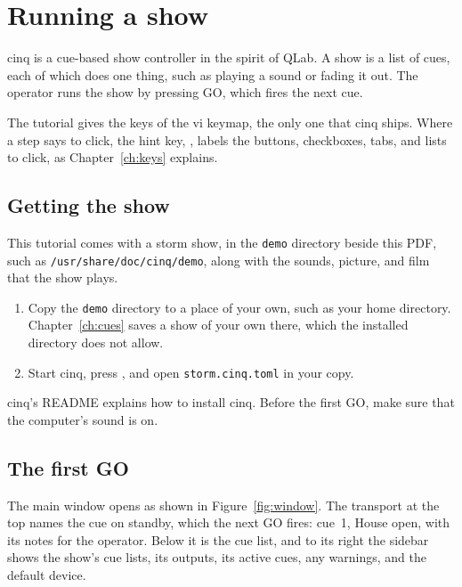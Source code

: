 %

\chapter{Running a show}
\label{ch:running}

cinq is a cue-based show controller in the spirit of QLab.  A show is a list
of cues, each of which does one thing, such as playing a sound or fading it
out.  The operator runs the show by pressing GO, which fires the next cue.

The tutorial gives the keys of the vi keymap, the only one that cinq ships.
Where a step says to click, the hint key, , labels the buttons,
checkboxes, tabs, and lists to click, as Chapter~\ref{ch:keys} explains.

\section{Getting the show}

This tutorial comes with a storm show, in the \texttt{demo} directory beside
this PDF, such as \texttt{/usr/share/doc/cinq/demo}, along with the sounds,
picture, and film that the show plays.

\begin{enumerate}
\item Copy the \texttt{demo} directory to a place of your own, such as your
  home directory.  Chapter~\ref{ch:cues} saves a show of your own there,
  which the installed directory does not allow.
\item Start cinq, press , and open \texttt{storm.cinq.toml}
  in your copy.
\end{enumerate}

cinq's README explains how to install cinq.  Before the first GO, make sure
that the computer's sound is on.

\section{The first GO}

The main window opens as shown in Figure~\ref{fig:window}.  The transport at
the top names the cue on standby, which the next GO fires: cue~1, House open,
with its notes for the operator.  Below it is the cue list, and to its right
the sidebar shows the show's cue lists, its outputs, its active cues, any
warnings, and the default device.

